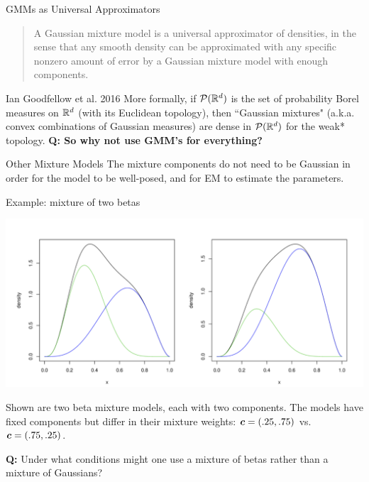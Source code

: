 \documentclass[10pt]{beamer}
\begin{document}
\begin{frame}{GMMs as Universal Approximators}

\begin{quote}
A Gaussian mixture model is a universal approximator of densities, in the sense that any smooth density can be approximated with any speciﬁc nonzero amount of error by a Gaussian mixture model with enough components.
\end{quote}

\hfill \tiny Ian Goodfellow et al. 2016
\vfill
\tiny More formally, if $\mathcal{P}(\mathbb{R}^d)$  is the set of probability Borel measures on $\mathbb{R}^d$ (with its Euclidean topology), then ``Gaussian mixtures" (a.k.a. convex combinations of Gaussian measures) are dense in $\mathcal{P}(\mathbb{R}^d)$ for the  weak*  topology.
\vfill \vfill \vfill
\tiny \bf{Q:} So why not use GMM's for everything?

\end{frame}

\begin{frame}{Other Mixture Models}
The mixture components do not need to be Gaussian in order for the model to be well-posed, and for EM to estimate the parameters.   \\
\vfill 
\begin{sblock}{Example: mixture of two betas}
\begin{center}
\includegraphics[width=.6\textwidth]{images/mixture_of_betas}

\end{center}
\scriptsize Shown are two beta mixture models, each with two components.  The models have fixed components but differ in their mixture weights: ${\boldsymbol c} = (.25, .75)$ vs. ${\boldsymbol c} = (.75, .25)$.
\end{sblock}

\vfill \vfill \vfill
\tiny \textbf{Q:} Under what conditions might one use a mixture of betas rather than a mixture of Gaussians?
\end{frame}
\end{document}
